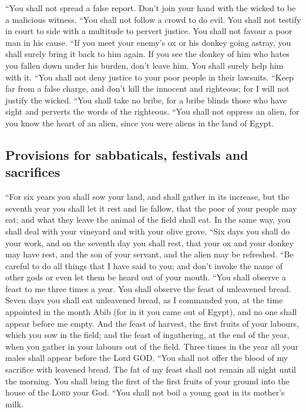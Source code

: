  ``You shall not spread a false report. Don't join your
hand with the wicked to be a malicious witness.  ``You
shall not follow a crowd to do evil. You shall not testify in court to
side with a multitude to pervert justice.  You shall not
favour a poor man in his cause.  ``If you meet your
enemy's ox or his donkey going astray, you shall surely bring it back to
him again.  If you see the donkey of him who hates you
fallen down under his burden, don't leave him. You shall surely help him
with it.  ``You shall not deny justice to your poor people
in their lawsuits.  ``Keep far from a false charge, and
don't kill the innocent and righteous; for I will not justify the
wicked.  ``You shall take no bribe, for a bribe blinds
those who have sight and perverts the words of the righteous.
 ``You shall not oppress an alien, for you know the heart
of an alien, since you were aliens in the land of Egypt.

\hypertarget{provisions-for-sabbaticals-festivals-and-sacrifices}{%
\subsection{Provisions for sabbaticals, festivals and
sacrifices}\label{provisions-for-sabbaticals-festivals-and-sacrifices}}

 ``For six years you shall sow your land, and shall
gather in its increase,  but the seventh year you shall
let it rest and lie fallow, that the poor of your people may eat; and
what they leave the animal of the field shall eat. In the same way, you
shall deal with your vineyard and with your olive grove. 
``Six days you shall do your work, and on the seventh day you shall
rest, that your ox and your donkey may have rest, and the son of your
servant, and the alien may be refreshed.  ``Be careful to
do all things that I have said to you; and don't invoke the name of
other gods or even let them be heard out of your mouth. 
``You shall observe a feast to me three times a year. 
You shall observe the feast of unleavened bread. Seven days you shall
eat unleavened bread, as I commanded you, at the time appointed in the
month Abib (for in it you came out of Egypt), and no one shall appear
before me empty.  And the feast of harvest, the first
fruits of your labours, which you sow in the field; and the feast of
ingathering, at the end of the year, when you gather in your labours out
of the field.  Three times in the year all your males
shall appear before the Lord GOD.  ``You shall not offer
the blood of my sacrifice with leavened bread. The fat of my feast shall
not remain all night until the morning.  You shall bring
the first of the first fruits of your ground into the house of the
\textsc{Lord} your God. ``You shall not boil a young goat in its
mother's milk.

